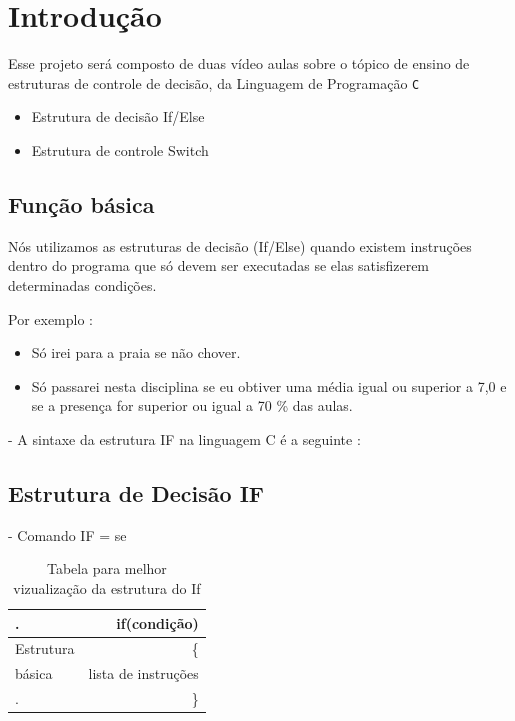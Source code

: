 \documentclass[a4paper,12pt]{article}  %
\begin{document}
\newpage

\section{Introdução}


   Esse projeto será composto de duas vídeo aulas sobre o tópico de ensino de estruturas de controle de decisão,  da Linguagem de Programação \texttt{C}

\begin{itemize}

 \item Estrutura de decisão If/Else
 \item Estrutura de controle Switch
\end{itemize}


 \subsection{Função básica}


    Nós utilizamos as estruturas de decisão (If/Else) quando existem instruções
dentro do programa que só devem ser executadas se elas satisfizerem  
determinadas condições. \newline

Por exemplo :

\begin{itemize}
               
       \item  Só irei para a praia se não chover. 
       \item  Só passarei nesta disciplina se eu obtiver uma média igual ou superior a 7,0 e se a presença for superior ou igual a 70 \% das aulas.
             
\end{itemize}

   - A sintaxe da estrutura IF na linguagem C é a seguinte :
 
 \subsection{Estrutura de Decisão IF}   
       
  -  Comando IF = se
   
\begin{table}[H]
\begin{center}
 \caption{Tabela para melhor vizualização da estrutura do If}
\begin{tabular}{|l|r|}
  \hline \hline
  
  .          & if(condição) \\ \hline
  Estrutura  &  \{           \\ \hline
    básica   &   lista de instruções  \\ \hline
  .          &  \}             \\ \hline
  
\end{tabular}
\label{tab:resultados}
\end{center}
\end{table}
\end{document}
